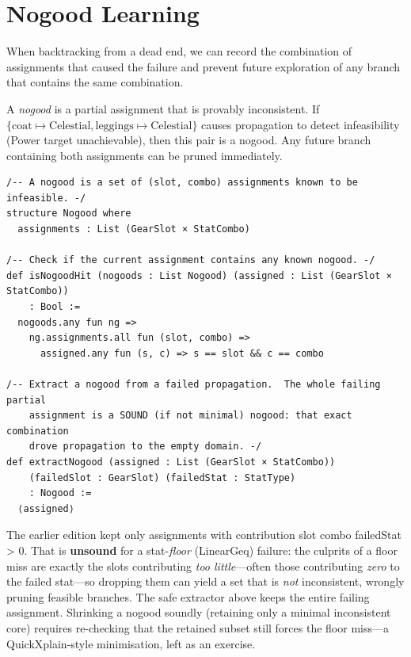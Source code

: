 \documentclass[11pt, a4paper, oneside]{book}
\newcommand{\li}[1]{{\ttfamily\small\color{deepblue}#1}}
\begin{document}
\section{Nogood Learning}

When backtracking from a dead end, we can record the combination of
assignments that caused the failure and prevent future exploration of any
branch that contains the same combination.

\begin{defbox}[title={Nogood}]
A \emph{nogood} is a partial assignment that is provably inconsistent.
If $\{\text{coat} \mapsto \text{Celestial}, \text{leggings} \mapsto
\text{Celestial}\}$ causes propagation to detect infeasibility (Power
target unachievable), then this pair is a nogood.  Any future branch
containing both assignments can be pruned immediately.
\end{defbox}

\begin{leanbox}[title={Lean 4 --- Nogood Store}]
\begin{verbatim}
/-- A nogood is a set of (slot, combo) assignments known to be infeasible. -/
structure Nogood where
  assignments : List (GearSlot × StatCombo)

/-- Check if the current assignment contains any known nogood. -/
def isNogoodHit (nogoods : List Nogood) (assigned : List (GearSlot × StatCombo))
    : Bool :=
  nogoods.any fun ng =>
    ng.assignments.all fun (slot, combo) =>
      assigned.any fun (s, c) => s == slot && c == combo

/-- Extract a nogood from a failed propagation.  The whole failing partial
    assignment is a SOUND (if not minimal) nogood: that exact combination
    drove propagation to the empty domain. -/
def extractNogood (assigned : List (GearSlot × StatCombo))
    (failedSlot : GearSlot) (failedStat : StatType)
    : Nogood :=
  ⟨assigned⟩
\end{verbatim}
\end{leanbox}

\begin{warningbox}[title={Minimising a nogood soundly is subtle}]
The earlier edition kept only assignments with
\li{contribution slot combo failedStat > 0}.  That is \textbf{unsound} for a
stat-\emph{floor} (LinearGeq) failure: the culprits of a floor miss are exactly
the slots contributing \emph{too little}---often those contributing \emph{zero}
to the failed stat---so dropping them can yield a set that is \emph{not}
inconsistent, wrongly pruning feasible branches.  The safe extractor above keeps
the entire failing assignment.  Shrinking a nogood soundly (retaining only a
minimal inconsistent core) requires re-checking that the retained subset still
forces the floor miss---a QuickXplain-style minimisation, left as an exercise.
\end{warningbox}
\end{document}
